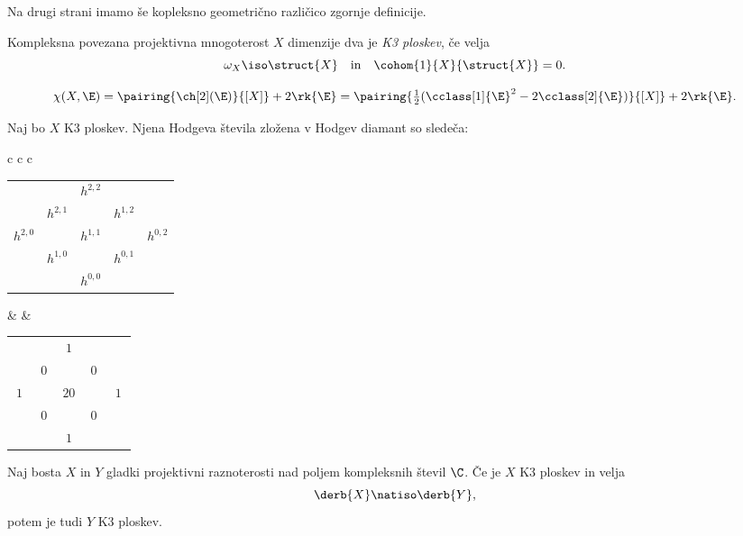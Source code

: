 Na drugi strani imamo še kopleksno geometrično različico zgornje definicije.

\begin{definicija}
    Kompleksna povezana projektivna mnogoterost $X$ dimenzije dva je \emph{K3 ploskev}, če velja
    \[
        \omega_X \iso \struct{X} \quad \text{in} \quad \cohom{1}{X}{\struct{X}} = 0.
    \]
\end{definicija}

\begin{equation}
    \chi(X, \E) = \pairing{\ch[2](\E)}{[X]} + 2\rk{\E} = \pairing{\tfrac{1}{2}(\cclass[1]{\E}^2 - 2\cclass[2]{\E})}{[X]} + 2 \rk{\E}.
\end{equation}

\begin{proposition}
    Naj bo $X$ K3 ploskev. Njena Hodgeva števila zložena v Hodgev diamant so sledeča:
    \begin{center}
        \begin{tabular}{c c c}
            \begin{tabular}{ccccc}
                &  & $h^{2,2}$ &  &  \\
                & $h^{2,1}$ &  & $h^{1,2}$ &  \\
                $h^{2,0}$ &  & $h^{1,1}$ &  & $h^{0,2}$ \\
                & $h^{1,0}$ &  & $h^{0,1}$ &  \\
                &  & $h^{0,0}$ &  &  \\
            \end{tabular} & \qquad &
            \begin{tabular}{ccccc}
                &  & $\ 1 \ $ &  &  \\
                & $\ 0 \ $ &  & $\ 0 \ $ &  \\
                $\ 1 \ $ &  & $20$ &  & $\ 1 \ $ \\
                & $0$ &  & $0$ &  \\
                &  & $1$ &  &  \\
            \end{tabular}
        \end{tabular}
    \end{center}
\end{proposition}

\begin{izrek}
    Naj bosta $X$ in $Y$ gladki projektivni raznoterosti nad poljem kompleksnih števil $\C$. Če je $X$ K3 ploskev in velja
    \[
        \derb{X} \natiso \derb{Y},
    \]
    potem je tudi $Y$ K3 ploskev. 
\end{izrek}


